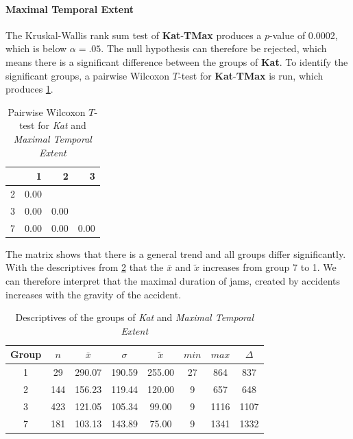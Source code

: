 \paragraph{Maximal Temporal Extent}
The Kruskal-Wallis rank sum test of \textbf{Kat}-\textbf{TMax} produces a $p$-value of 0.0002, which is below $\alpha=.05$. The null hypothesis can therefore be rejected, which means there is a significant difference between the groups of \textbf{Kat}. To identify the significant groups, a pairwise Wilcoxon $T$-test for \textbf{Kat}-\textbf{TMax} is run, which produces \cref{tbl:wilcoxon_baysis_initiator_Kat_TMax}. 
\begin{table}[ht]
	\centering
	\begin{tabular}{rrrr}
		\toprule  
  		& 1 & 2 & 3 \\ 
  		\midrule    
        2 & 0.00 &  &  \\ 
        3 & 0.00 & 0.00 &  \\ 
        7 & 0.00 & 0.00 & 0.00 \\ 
 		\bottomrule
	\end{tabular}
    \caption{Pairwise Wilcoxon $T$-test for \textit{Kat} and \textit{Maximal Temporal Extent}}
    \label{tbl:wilcoxon_baysis_initiator_Kat_TMax}
\end{table}
The matrix shows that there is a general trend and all groups differ significantly. With the descriptives from \cref{tbl:descriptives_baysis_initiator_Kat_TMax} that the $\bar{x}$ and $\tilde{x}$ increases from group 7 to 1. We can therefore interpret that the maximal duration of jams, created by accidents increases with the gravity of the accident.
\begin{table}[ht]
	\centering
	\begin{tabular}{c|c|c|c|c|c|c|c}
		\toprule  
		Group & $n$ & $\bar{x}$ & $\sigma$ & $\tilde{x}$ & $min$ & $max$ & $\Delta$ \\
        \midrule
        1 & 29  & 290.07 & 190.59 & 255.00 & 27 & 864  & 837 \\ 
        2 & 144 & 156.23 & 119.44 & 120.00 & 9  & 657  & 648 \\ 
        3 & 423 & 121.05 & 105.34 & 99.00  & 9  & 1116 & 1107 \\ 
        7 & 181 & 103.13 & 143.89 & 75.00  & 9  & 1341 & 1332 \\ 
 		\bottomrule
	\end{tabular}
    \caption{Descriptives of the groups of \textit{Kat} and \textit{Maximal Temporal Extent}}
    \label{tbl:descriptives_baysis_initiator_Kat_TMax}
\end{table}

